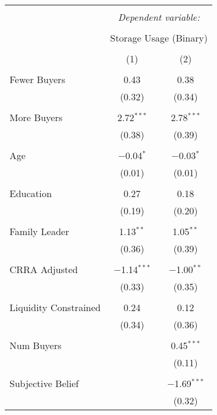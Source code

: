 
\begin{table}[!htbp] \centering 
  \caption{} 
  \label{tab: binary storage ~ farmer's expectation on movement} 
\footnotesize 
\begin{tabular}{@{\extracolsep{5pt}}lcc} 
\\[-1.8ex]\hline 
\hline \\[-1.8ex] 
 & \multicolumn{2}{c}{\textit{Dependent variable:}} \\ 
\cline{2-3} 
\\[-1.8ex] & \multicolumn{2}{c}{Storage Usage (Binary)} \\ 
\\[-1.8ex] & (1) & (2)\\ 
\hline \\[-1.8ex] 
 Fewer Buyers & 0.43 & 0.38 \\ 
  & (0.32) & (0.34) \\ 
  & & \\ 
 More Buyers & 2.72$^{***}$ & 2.78$^{***}$ \\ 
  & (0.38) & (0.39) \\ 
  & & \\ 
 Age & $-$0.04$^{*}$ & $-$0.03$^{*}$ \\ 
  & (0.01) & (0.01) \\ 
  & & \\ 
 Education & 0.27 & 0.18 \\ 
  & (0.19) & (0.20) \\ 
  & & \\ 
 Family Leader & 1.13$^{**}$ & 1.05$^{**}$ \\ 
  & (0.36) & (0.39) \\ 
  & & \\ 
 CRRA Adjusted & $-$1.14$^{***}$ & $-$1.00$^{**}$ \\ 
  & (0.33) & (0.35) \\ 
  & & \\ 
 Liquidity Constrained & 0.24 & 0.12 \\ 
  & (0.34) & (0.36) \\ 
  & & \\ 
 Num Buyers &  & 0.45$^{***}$ \\ 
  &  & (0.11) \\ 
  & & \\ 
 Subjective Belief &  & $-$1.69$^{***}$ \\ 
  &  & (0.32) \\ 

\end{tabular}
\end{table}
